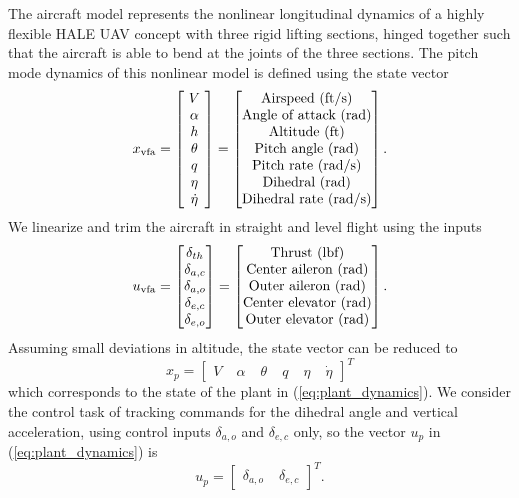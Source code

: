 The aircraft model represents the nonlinear longitudinal dynamics of a highly flexible HALE UAV concept with three rigid lifting sections, hinged together such that the aircraft is able to bend at the joints of the three sections. The pitch mode dynamics of this nonlinear model is defined using the state vector
\begin{equation}
x_{\text{vfa}} = \begin{bmatrix}
~V~\\
\alpha \\
h \\
\theta \\
q\\
\eta\\
\dot{\eta}
\end{bmatrix} =
\begin{bmatrix}
	 $Airspeed (ft/s)$\\ $Angle of attack (rad)$\\ $Altitude (ft)$\\ $Pitch angle (rad)$\\ $Pitch rate (rad/s)$\\ $Dihedral (rad)$\\ $Dihedral rate (rad/s)$
\end{bmatrix}.
\end{equation}
We linearize and trim the aircraft in straight and level flight using the inputs
\begin{equation}
	u_{\text{vfa}} = \begin{bmatrix}
\delta_{th} \\
\delta_{a,c} \\
\delta_{a,o} \\
\delta_{e,c} \\
\delta_{e,o} 
\end{bmatrix} = \begin{bmatrix}
		$Thrust (lbf)$\\
		$Center aileron (rad)$\\
		$Outer aileron (rad)$\\
		$Center elevator (rad)$\\
		$Outer elevator (rad)$
	\end{bmatrix}.
\end{equation}
Assuming small deviations in altitude, the state vector can be reduced to 
\begin{equation}
	x_p = \begin{bmatrix}
V & \; \alpha & \; \theta & \; q & \; \eta & \; \dot{\eta}
\end{bmatrix}^T
\end{equation}
which corresponds to the state of the plant in (\ref{eq:plant_dynamics}). We consider the control task of tracking commands for the dihedral angle and vertical acceleration, using control inputs $\delta_{a,o}$ and $\delta_{e,c}$ only, so the vector $u_p$ in (\ref{eq:plant_dynamics}) is
\begin{equation}
	u_p = \begin{bmatrix}
\delta_{a,o} & \; \delta_{e,c}
\end{bmatrix}^T.
\end{equation}

